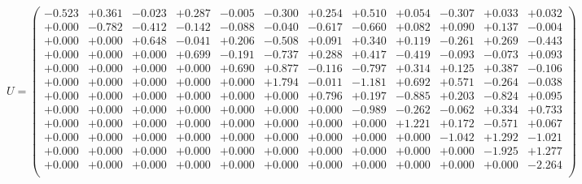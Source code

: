 \documentclass[9pt]{article}
\theoremstyle{plain}
\theoremstyle{definition}
\theoremstyle{remark}
\numberwithin{equation}{section}
\begin{document}
$U = \left(
\begin{array}{
cccccccccccc}
-0.523 & +0.361 & -0.023 & +0.287 & -0.005 & -0.300 & +0.254 & +0.510 & +0.054 & -0.307 & +0.033 & +0.032 \\
+0.000 & -0.782 & -0.412 & -0.142 & -0.088 & -0.040 & -0.617 & -0.660 & +0.082 & +0.090 & +0.137 & -0.004 \\
+0.000 & +0.000 & +0.648 & -0.041 & +0.206 & -0.508 & +0.091 & +0.340 & +0.119 & -0.261 & +0.269 & -0.443 \\
+0.000 & +0.000 & +0.000 & +0.699 & -0.191 & -0.737 & +0.288 & +0.417 & -0.419 & -0.093 & -0.073 & +0.093 \\
+0.000 & +0.000 & +0.000 & +0.000 & +0.690 & +0.877 & -0.116 & -0.797 & +0.314 & +0.125 & +0.387 & -0.106 \\
+0.000 & +0.000 & +0.000 & +0.000 & +0.000 & +1.794 & -0.011 & -1.181 & +0.692 & +0.571 & -0.264 & -0.038 \\
+0.000 & +0.000 & +0.000 & +0.000 & +0.000 & +0.000 & +0.796 & +0.197 & -0.885 & +0.203 & -0.824 & +0.095 \\
+0.000 & +0.000 & +0.000 & +0.000 & +0.000 & +0.000 & +0.000 & -0.989 & -0.262 & -0.062 & +0.334 & +0.733 \\
+0.000 & +0.000 & +0.000 & +0.000 & +0.000 & +0.000 & +0.000 & +0.000 & +1.221 & +0.172 & -0.571 & +0.067 \\
+0.000 & +0.000 & +0.000 & +0.000 & +0.000 & +0.000 & +0.000 & +0.000 & +0.000 & -1.042 & +1.292 & -1.021 \\
+0.000 & +0.000 & +0.000 & +0.000 & +0.000 & +0.000 & +0.000 & +0.000 & +0.000 & +0.000 & -1.925 & +1.277 \\
+0.000 & +0.000 & +0.000 & +0.000 & +0.000 & +0.000 & +0.000 & +0.000 & +0.000 & +0.000 & +0.000 & -2.264 \\
\end{array}
\right)$ \newline 
\end{document}
